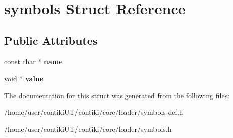 \hypertarget{structsymbols}{}\section{symbols Struct Reference}
\label{structsymbols}
\subsection*{Public Attributes}
\begin{DoxyCompactItemize}
\item 
\hypertarget{structsymbols_a29fe49d25cb1029ab99dca0a9a634684}{}const char $\ast$ {\bfseries name}\label{structsymbols_a29fe49d25cb1029ab99dca0a9a634684}

\item 
\hypertarget{structsymbols_a7db8ebd1f2af86607a35a00231e3133f}{}void $\ast$ {\bfseries value}\label{structsymbols_a7db8ebd1f2af86607a35a00231e3133f}

\end{DoxyCompactItemize}


The documentation for this struct was generated from the following files\+:\begin{DoxyCompactItemize}
\item 
/home/user/contiki\+U\+T/contiki/core/loader/symbols-\/def.\+h\item 
/home/user/contiki\+U\+T/contiki/core/loader/symbols.\+h\end{DoxyCompactItemize}
